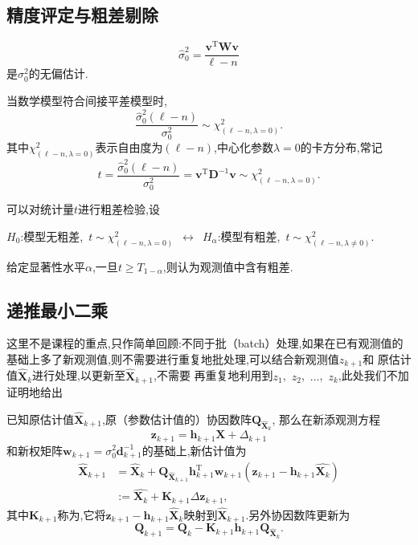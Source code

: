 \documentclass[cn,10pt,citestyle=gb7714-2015,bibstyle=gb7714-2015]{elegantbook}
\newcommand{\mT}{\mathrm{T}}
\renewcommand{\l}{\ell}
\begin{document}
\subsection{精度评定与粗差剔除}
\begin{proposition}[验后单位权中误差]\label{pro:after-var}
  \[
    \hat{\sigma}_0^2=\frac{\bm{v}^\mT\bm{W}\bm{v}}{\l-n}
  \]  
  是$\sigma_0^2$的无偏估计.
\end{proposition}
\begin{proposition}\label{pro:chi2}
  当数学模型符合间接平差模型时,
  \begin{equation}
    \frac{\hat{\sigma}_0^2(\l-n)}{\sigma_0^2}\sim\chi^2_{(\l-n,\lambda=0)}.
  \end{equation}
  其中$\chi^2_{(\l-n,\lambda=0)}$表示自由度为$(\l-n)$,中心化参数$\lambda=0$的卡方分布,常记
  \[
      t=\frac{\hat{\sigma}_0^2(\l-n)}{\sigma_0^2}=\bm{v}^\mT\bm{D}^{-1}\bm{v}\sim\chi^2_{(\l-n,\lambda=0)}.
  \]
\end{proposition}
可以对统计量$t$进行粗差检验,设
\begin{center}
  $H_0$:模型无粗差,\ $t\sim\chi^2_{(\l-n,\lambda=0)}$\ $\longleftrightarrow$\ $H_\alpha$:模型有粗差,\ $t\sim\chi^2_{(\l-n,\lambda\neq 0)}$.
\end{center}
给定显著性水平$\alpha$,一旦$t\geqslant T_{1-\alpha}$,则认为观测值中含有粗差.
\subsection{递推最小二乘}\label{sec:recursion-LS}
这里不是课程的重点,只作简单回顾:不同于批（batch）处理,如果在已有观测值的
基础上多了新观测值,则不需要进行重复地批处理,可以结合新观测值$z_{k+1}$和
原估计值$\hat{\bm{X}}_k$进行处理,以更新至$\hat{\bm{X}}_{k+1}$,不需要
再重复地利用到$z_1$,\ $z_2$,\ $\ldots$,\ $z_k$,此处我们不加证明地给出
\begin{theorem}[递推最小二乘的递推式]\label{thm:recursion-LS}
  已知原估计值$\hat{\bm{X}}_{k+1}$,原（参数估计值的）协因数阵$\bm{Q}_{\hat{\bm{X}}_k}$,
  那么在新添观测方程
  \begin{equation}
    \bm{z}_{k+1}=\bm{h}_{k+1}\bm{X}+\bm{\varDelta}_{k+1}
  \end{equation}
  和新权矩阵$\bm{w}_{k+1}=\sigma_0^2\bm{d}_{k+1}^{-1}$的基础上,新估计值为
  \begin{align}
    \hat{\bm{X}}_{k+1}&=\hat{\bm{X}}_k+\bm{Q}_{\hat{\bm{X}}_{k+1}}\bm{h}^\mT_{k+1}\bm{w}_{k+1}(\bm{z}_{k+1}-\bm{h}_{k+1}\hat{\bm{X}_k})\\
    &:=\hat{\bm{X}_k}+\bm{K}_{k+1}\Delta \bm{z}_{k+1},
  \end{align}
  其中$\bm{K}_{k+1}$称为,它将$\bm{z}_{k+1}-\bm{h}_{k+1}\hat{\bm{X}}_k$映射到$\hat{\bm{X}}_{k+1}$.另外协因数阵更新为
  \begin{equation}
    \bm{Q}_{k+1}=\bm{Q}_k-\bm{K}_{k+1}\bm{h}_{k+1}\bm{Q}_{\hat{\bm{X}}_k}.
  \end{equation}
\end{theorem}
\end{document}
